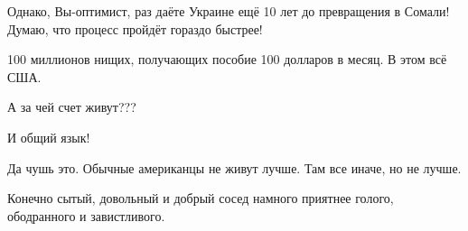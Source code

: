 \begin{itemize}
 
Однако, Вы-оптимист, раз даёте Украине ещё 10 лет до превращения в Сомали! Думаю, что процесс пройдёт гораздо быстрее!

 
100 миллионов нищих, получающих пособие 100 долларов в месяц. В этом всё США.

 
А за чей счет живут???

 
И общий язык!

 
Да чушь это. Обычные американцы не живут лучше. Там все иначе, но не лучше.

 
Конечно сытый, довольный и добрый сосед намного приятнее голого, ободранного и завистливого.

\begin{itemize}
 

\end{itemize}
\end{itemize}
